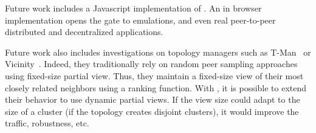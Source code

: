 Future work includes a Javascript implementation of \SPRAY. An in
browser implementation opens the gate to emulations, and even
real peer-to-peer distributed and decentralized applications.

Future work also includes investigations on topology managers such as
T-Man~\cite{jelasity2009tman} or
Vicinity~\cite{voulgaris2005epidemic}. Indeed, they traditionally rely
on random peer sampling approaches using fixed-size partial
view. Thus, they maintain a fixed-size view of their most closely
related neighbors using a ranking function. With \SPRAY, it is
possible to extend their behavior to use dynamic partial views. If
the view size could adapt to the size of a cluster (if the topology
creates disjoint clusters), it would improve the traffic, robustness,
etc.

